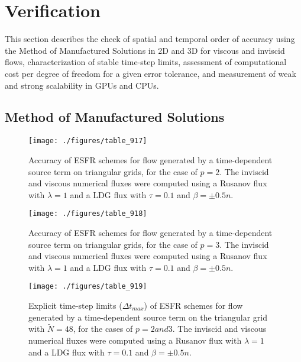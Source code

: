 \section{Verification}
\label{sec:verification}
This section describes the check of spatial and temporal order of accuracy using the Method of Manufactured Solutions in 2D and 3D for viscous and inviscid flows, characterization of stable time-step limits, assessment of computational cost per degree of freedom for a given error tolerance, and measurement of weak and strong scalability in GPUs and CPUs.

\subsection{Method of Manufactured Solutions}

\begin{figure}
\centering
\texttt{[image: ./figures/table\_917]} \\
\caption{Accuracy of ESFR schemes for flow generated by a time-dependent source term on triangular grids, for the case of $p = 2$. The inviscid and viscous numerical fluxes were computed using a Rusanov flux with $\lambda = 1$ and a LDG flux with $\tau = 0.1$ and $\beta = \pm 0.5n$.}
\label{fig:table_917}
\end{figure}

\begin{figure}
\centering
\texttt{[image: ./figures/table\_918]} \\
\caption{Accuracy of ESFR schemes for flow generated by a time-dependent source term on triangular grids, for the case of $p = 3$. The inviscid and viscous numerical fluxes were computed using a Rusanov flux with $\lambda = 1$ and a LDG flux with $\tau = 0.1$ and $\beta = \pm 0.5n$.}
\label{fig:table_918}
\end{figure}

\begin{figure}
\centering
\texttt{[image: ./figures/table\_919]} \\
\caption{Explicit time-step limits ($\Delta t_{max}$) of ESFR schemes for flow generated by a time-dependent source term on the triangular grid with $\tilde{N} = 48$, for the cases of $p = 2 and 3$. The inviscid and viscous numerical fluxes were computed using a Rusanov flux with $\lambda = 1$ and a LDG flux with $\tau = 0.1$ and $\beta = \pm 0.5n$.}
\label{fig:table_919}
\end{figure}

